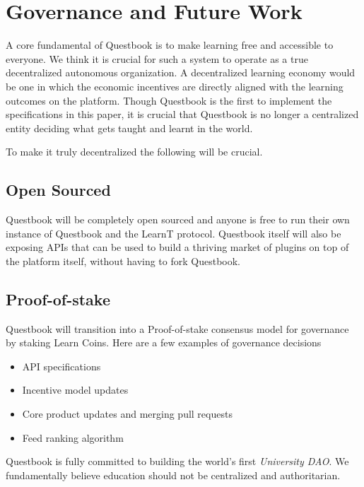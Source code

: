 \documentclass{article}
\begin{document}
  \section{Governance and Future Work}
    A core fundamental of Questbook is to make learning free and accessible to everyone. 
    We think it is crucial for such a system to operate as a true decentralized autonomous organization. 
    A decentralized learning economy would be one in which the economic incentives are directly aligned with the learning outcomes on the platform.
    Though Questbook is the first to implement the specifications in this paper, it is crucial that Questbook is no longer a centralized entity deciding what gets taught and learnt in the world.
    \par
    To make it truly decentralized the following will be crucial.
    \subsection{Open Sourced}
      Questbook will be completely open sourced and anyone is free to run their own instance of Questbook and the LearnT protocol.
      Questbook itself will also be exposing APIs that can be used to build a thriving market of plugins on top of the platform itself, without having to fork Questbook.

    \subsection{Proof-of-stake}
      Questbook will transition into a Proof-of-stake consensus model for governance by staking Learn Coins.
      Here are a few examples of governance decisions 
      \begin{itemize}
        \item API specifications
        \item Incentive model updates
        \item Core product updates and merging pull requests
        \item Feed ranking algorithm 
      \end{itemize}

    Questbook is fully committed to building the world's first \textit{University DAO}.
    We fundamentally believe education should not be centralized and authoritarian.
\end{document}

